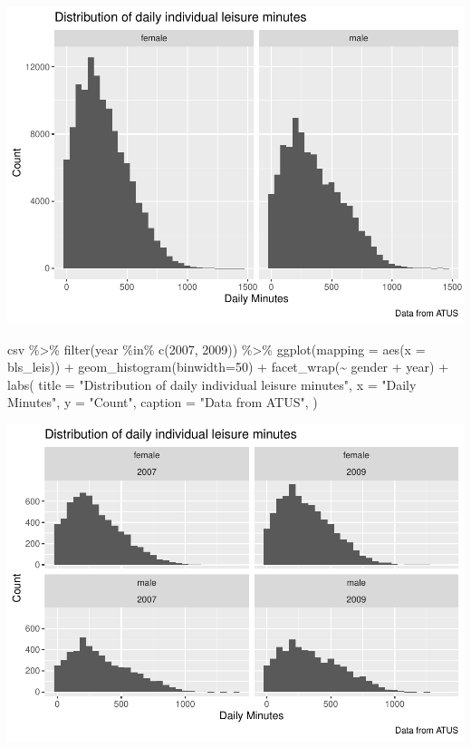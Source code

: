 \documentclass[
]{article}
\newenvironment{Shaded}{\begin{snugshade}}{\end{snugshade}}
\newcommand{\AttributeTok}[1]{\textcolor[rgb]{0.77,0.63,0.00}{#1}}
\newcommand{\DecValTok}[1]{\textcolor[rgb]{0.00,0.00,0.81}{#1}}
\newcommand{\FunctionTok}[1]{\textcolor[rgb]{0.00,0.00,0.00}{#1}}
\newcommand{\NormalTok}[1]{#1}
\newcommand{\SpecialCharTok}[1]{\textcolor[rgb]{0.00,0.00,0.00}{#1}}
\newcommand{\StringTok}[1]{\textcolor[rgb]{0.31,0.60,0.02}{#1}}
\begin{document}
\includegraphics{Paper2_files/figure-latex/graphs-3.pdf}

\begin{Shaded}
\begin{Highlighting}[]
\NormalTok{csv }\SpecialCharTok{\%\textgreater{}\%}
  \FunctionTok{filter}\NormalTok{(year }\SpecialCharTok{\%in\%} \FunctionTok{c}\NormalTok{(}\DecValTok{2007}\NormalTok{, }\DecValTok{2009}\NormalTok{)) }\SpecialCharTok{\%\textgreater{}\%}
  \FunctionTok{ggplot}\NormalTok{(}\AttributeTok{mapping =} \FunctionTok{aes}\NormalTok{(}\AttributeTok{x =}\NormalTok{ bls\_leis)) }\SpecialCharTok{+}
  \FunctionTok{geom\_histogram}\NormalTok{(}\AttributeTok{binwidth=}\DecValTok{50}\NormalTok{) }\SpecialCharTok{+}
  \FunctionTok{facet\_wrap}\NormalTok{(}\SpecialCharTok{\textasciitilde{}}\NormalTok{ gender }\SpecialCharTok{+}\NormalTok{ year) }\SpecialCharTok{+}
  \FunctionTok{labs}\NormalTok{(}
  \AttributeTok{title =} \StringTok{"Distribution of daily individual leisure minutes"}\NormalTok{,}
  \AttributeTok{x =} \StringTok{"Daily Minutes"}\NormalTok{,}
  \AttributeTok{y =} \StringTok{"Count"}\NormalTok{,}
  \AttributeTok{caption =} \StringTok{"Data from ATUS"}\NormalTok{,}
\NormalTok{)}
\end{Highlighting}
\end{Shaded}

\includegraphics{Paper2_files/figure-latex/graphs-4.pdf}
\end{document}

